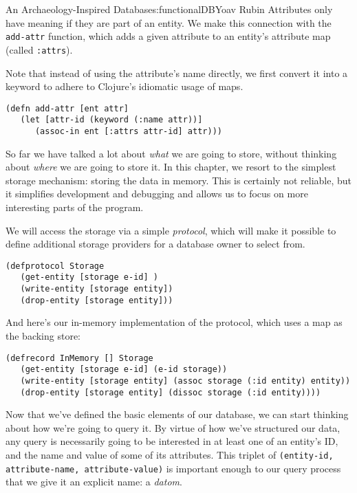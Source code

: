 \begin{aosachapter}{An Archaeology-Inspired Database}{s:functionalDB}{Yoav Rubin}
Attributes only have meaning if they are part of an entity. We make this
connection with the \texttt{add-attr} function, which adds a given
attribute to an entity's attribute map (called \texttt{:attrs}).

Note that instead of using the attribute's name directly, we first
convert it into a keyword to adhere to Clojure's idiomatic usage of
maps.

\begin{verbatim}
(defn add-attr [ent attr]
   (let [attr-id (keyword (:name attr))]
      (assoc-in ent [:attrs attr-id] attr)))
\end{verbatim}

\label{storage}

So far we have talked a lot about \emph{what} we are going to store,
without thinking about \emph{where} we are going to store it. In this
chapter, we resort to the simplest storage mechanism: storing the data
in memory. This is certainly not reliable, but it simplifies development
and debugging and allows us to focus on more interesting parts of the
program.

We will access the storage via a simple \emph{protocol}, which will make
it possible to define additional storage providers for a database owner
to select from.

\begin{verbatim}
(defprotocol Storage
   (get-entity [storage e-id] )
   (write-entity [storage entity])
   (drop-entity [storage entity]))
\end{verbatim}

And here's our in-memory implementation of the protocol, which uses a
map as the backing store:

\begin{verbatim}
(defrecord InMemory [] Storage
   (get-entity [storage e-id] (e-id storage))
   (write-entity [storage entity] (assoc storage (:id entity) entity))
   (drop-entity [storage entity] (dissoc storage (:id entity))))
\end{verbatim}

\label{indexing-the-data}

Now that we've defined the basic elements of our database, we can start
thinking about how we're going to query it. By virtue of how we've
structured our data, any query is necessarily going to be interested in
at least one of an entity's ID, and the name and value of some of its
attributes. This triplet of
\texttt{(entity-id, attribute-name, attribute-value)} is important
enough to our query process that we give it an explicit name: a
\emph{datom}.


\end{aosachapter}
